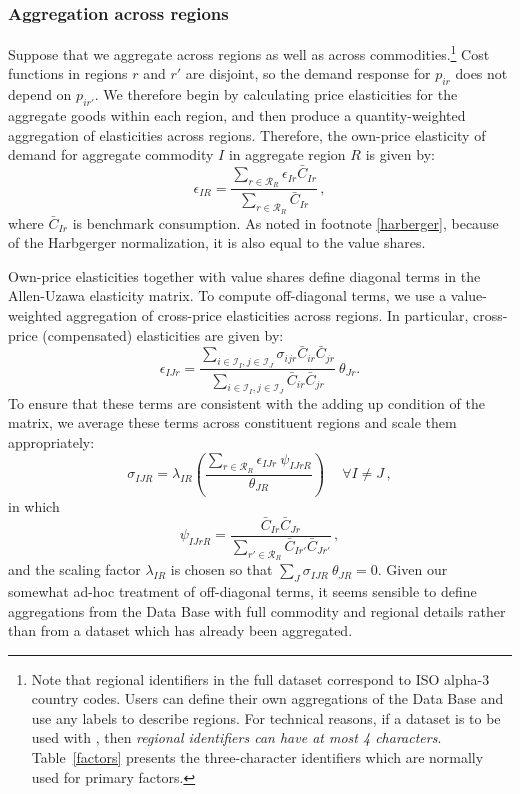 \subsubsection{Aggregation across regions}

Suppose that we aggregate across regions as well as across
commodities.\footnote{Note that regional identifiers in the full
dataset correspond to ISO alpha-3 country codes. Users can define
their own aggregations of the \GTAP Data Base and use any labels to
describe regions. For technical reasons, if a dataset is to be
used with \MPSGE, then \textit{regional identifiers can have at most 4
characters}. Table~\ref{factors} presents the three-character
identifiers which are normally used for primary factors. } Cost
functions in regions $r$ and $r'$ are disjoint, so the demand response
for $p_{ir}$ does not depend on $p_{ir'}$. We therefore begin by
calculating price elasticities for the aggregate goods within each
region, and then produce a quantity-weighted aggregation of
elasticities across regions. Therefore, the own-price elasticity of
demand for aggregate commodity $I$ in aggregate region $R$ is given
by:
$$\epsilon_{IR} = \frac
{\sum_{r\in \mathcal{R}_R} \epsilon_{Ir} \bar C_{Ir}}
{\sum_{r\in \mathcal{R}_R}               \bar C_{Ir}}\,,$$
where $\bar C_{Ir}$ is benchmark consumption. As noted in footnote
\ref{harberger}, because of the Harbgerger normalization, it is also
equal to the value shares.

Own-price elasticities together with value shares define diagonal
terms in the Allen-Uzawa elasticity matrix. To compute off-diagonal
\AUES terms, we use a value-weighted aggregation of cross-price
elasticities across regions. In particular, cross-price (compensated)
elasticities are given by:
$$\epsilon_{IJr} = \frac
{\sum_{i\in \mathcal{I}_I, j \in \mathcal{I}_J} \sigma_{ijr}
\bar C_{ir} \bar C_{jr}}
{\sum_{i\in \mathcal{I}_I, j \in \mathcal{I}_J}  \bar C_{ir} \bar
C_{jr}} ~ \theta_{Jr}. $$
To ensure that these terms are consistent with the adding up condition
of the \AUES matrix, we average these terms across
constituent regions and scale them appropriately:
$$\sigma_{IJR} = \lambda_{IR} \left( \frac{\sum_{r \in \mathcal{R}_R}
\epsilon_{IJr} ~ \psi_{IJrR}} {\theta_{JR}} \right) ~  \quad \forall
I \neq J\,,$$
in which
$$\psi_{IJrR} = \frac{\bar C_{Ir} \bar C_{Jr}}
{\sum_{r'\in \mathcal{R}_R} \bar C_{Ir'} \bar C_{Jr'}}\,,$$ and the
scaling factor $\lambda_{IR}$ is chosen so that $\sum_J \sigma_{IJR} ~
\theta_{JR} = 0$. Given our somewhat ad-hoc treatment of off-diagonal
terms, it seems sensible to define aggregations from the \GTAP Data Base
with full commodity and regional details rather than from a dataset
which has already been aggregated.

